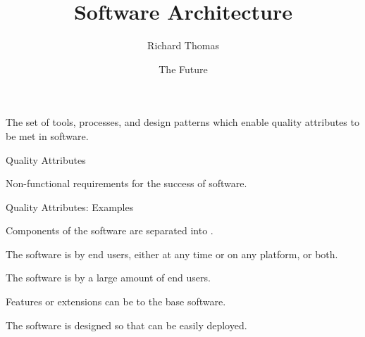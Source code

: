 \documentclass{slide}
\title{Software Architecture}
\author{Richard Thomas}
\date{The Future}
\begin{document}
\maketitle






%
{The set of tools, processes, and design patterns which enable quality attributes to be met in software.}


\begin{frame}{Quality Attributes}

Non-functional requirements for the success of software.

\end{frame}

\begin{frame}{Quality Attributes: Examples}

\begin{description}[<+->]
    \item[Modularity] Components of the software are separated into .
    \item[Availability] The software is  by end users, either at any time or on any platform, or both.
    \item[Scalability] The software is  by a large amount of end users.
    \item[Extensibility] Features or extensions can be  to the base software.
    \item[Testibility] The software is designed so that  can be easily deployed.
\end{description}

\end{frame}

\end{document}
